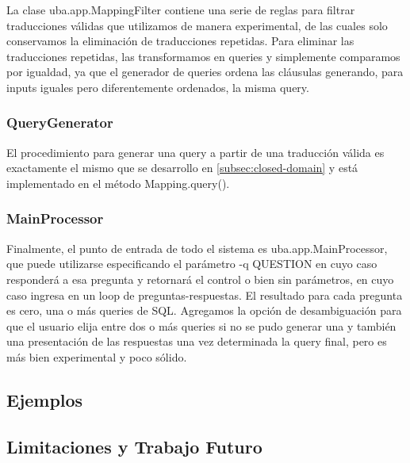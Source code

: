 La clase uba.app.MappingFilter contiene una serie de reglas para filtrar traducciones válidas que utilizamos de manera experimental, de las cuales solo conservamos la eliminación de traducciones repetidas. Para eliminar las traducciones repetidas, las transformamos en queries y simplemente comparamos por igualdad, ya que el generador de queries ordena las cláusulas generando, para inputs iguales pero diferentemente ordenados, la misma query.



\subsubsection*{QueryGenerator}
\label{subsubsec:query-generator}

El procedimiento para generar una query a partir de una traducción válida es exactamente el mismo que se desarrollo en \ref{subsec:closed-domain} y está implementado en el método Mapping.query().


\subsubsection*{MainProcessor}
\label{subsubsec:main-processor}

Finalmente, el punto de entrada de todo el sistema es uba.app.MainProcessor, que puede utilizarse especificando el parámetro -q QUESTION en cuyo caso responderá a esa pregunta y retornará el control o bien sin parámetros, en cuyo caso ingresa en un loop de preguntas-respuestas. El resultado para cada pregunta es cero, una o más queries de SQL.
Agregamos la opción de desambiguación para que el usuario elija entre dos o más queries si no se pudo generar una y también una presentación de las respuestas una vez determinada la query final, pero es más bien experimental y poco sólido.

\subsection{Ejemplos}
\label{subsec:popescu-ejemplos}


\subsection{Limitaciones y Trabajo Futuro}
\label{subsec:popescu-cierre}